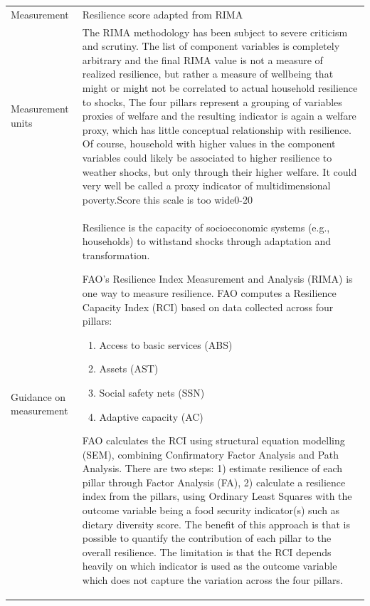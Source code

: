 \documentclass[
  letterpaper,
  DIV=11,
  numbers=noendperiod]{scrreprt}
\begin{document}
\begin{longtable}[]{@{}
  >{\raggedright\arraybackslash}p{}
  >{\raggedright\arraybackslash}p{}@{}}
Measurement & Resilience score adapted from RIMA \\
Measurement units & \label{138}{The RIMA methodology has
been subject to severe criticism and scrutiny. The list of component
variables is completely arbitrary and the final RIMA value is not a
measure of realized resilience, but rather a measure of wellbeing that
might or might not be correlated to actual household resilience to
shocks, The four pillars represent a grouping of variables proxies of
welfare and the resulting indicator is again a welfare proxy, which has
little conceptual relationship with resilience. Of course, household
with higher values in the component variables could likely be associated
to higher resilience to weather shocks, but only through their higher
welfare. It could very well be called a proxy indicator of
multidimensional poverty.}Score \label{139}{this scale is
too wide}0-20\label{138}{\label{139}{}} \\
Guidance on measurement & \begin{minipage}[t]{\linewidth}\raggedright
Resilience is the capacity of socioeconomic systems (e.g., households)
to withstand shocks through adaptation and transformation.

FAO's Resilience Index Measurement and Analysis (RIMA) is one way to
measure resilience. FAO computes a Resilience Capacity Index (RCI) based
on data collected across four pillars:

\begin{enumerate}
\def\labelenumi{\arabic{enumi}.}
\item
  Access to basic services (ABS)
\item
  Assets (AST)
\item
  Social safety nets (SSN)
\item
  Adaptive capacity (AC)
\end{enumerate}

FAO calculates the RCI using structural equation modelling (SEM),
combining Confirmatory Factor Analysis and Path Analysis. There are two
steps: 1) estimate resilience of each pillar through Factor Analysis
(FA), 2) calculate a resilience index from the pillars, using Ordinary
Least Squares with the outcome variable being a food security
indicator(s) such as dietary diversity score. The benefit of this
approach is that is possible to quantify the contribution of each pillar
to the overall resilience. The limitation is that the RCI depends
heavily on which indicator is used as the outcome variable which does
not capture the variation across the four pillars.


\end{minipage}
\end{longtable}
\end{document}
